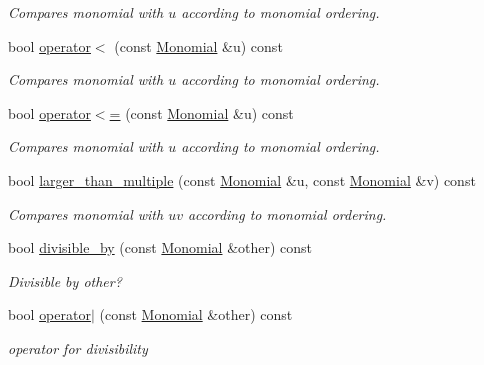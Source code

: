 \begin{Indent}
\begin{DoxyCompactItemize}
\begin{DoxyCompactList}\small\item\em Compares monomial with $u$ according to monomial ordering. \end{DoxyCompactList}\item 
\mbox{\label{group__polygroup_a6b3223572db10a2231049f449232b19e}} 
bool \hyperlink{group__polygroup_a6b3223572db10a2231049f449232b19e}{operator$<$} (const \hyperlink{group__polygroup_class_monomial}{Monomial} \&u) const
\begin{DoxyCompactList}\small\item\em Compares monomial with $u$ according to monomial ordering. \end{DoxyCompactList}\item 
\mbox{\label{group__polygroup_a89124b9c5534435a9c044ac54705b8fc}} 
bool \hyperlink{group__polygroup_a89124b9c5534435a9c044ac54705b8fc}{operator$<$=} (const \hyperlink{group__polygroup_class_monomial}{Monomial} \&u) const
\begin{DoxyCompactList}\small\item\em Compares monomial with $u$ according to monomial ordering. \end{DoxyCompactList}\item 
\mbox{\label{group__polygroup_a1cac303db5d3cc66247137172cf84145}} 
bool \hyperlink{group__polygroup_a1cac303db5d3cc66247137172cf84145}{larger\+\_\+than\+\_\+multiple} (const \hyperlink{group__polygroup_class_monomial}{Monomial} \&u, const \hyperlink{group__polygroup_class_monomial}{Monomial} \&v) const
\begin{DoxyCompactList}\small\item\em Compares monomial with $uv$ according to monomial ordering. \end{DoxyCompactList}\item 
\mbox{\label{group__polygroup_aa0341b299fa1fcd4459f9a6810768f0e}} 
bool \hyperlink{group__polygroup_aa0341b299fa1fcd4459f9a6810768f0e}{divisible\+\_\+by} (const \hyperlink{group__polygroup_class_monomial}{Monomial} \&other) const
\begin{DoxyCompactList}\small\item\em Divisible by {\ttfamily other}? \end{DoxyCompactList}\item 
\mbox{\label{group__polygroup_a4673d0cabc6284ce01a08f6c9f71a646}} 
bool \hyperlink{group__polygroup_a4673d0cabc6284ce01a08f6c9f71a646}{operator$\vert$} (const \hyperlink{group__polygroup_class_monomial}{Monomial} \&other) const
\begin{DoxyCompactList}\small\item\em operator for divisibility \end{DoxyCompactList}\end{DoxyCompactItemize}
\end{Indent}
